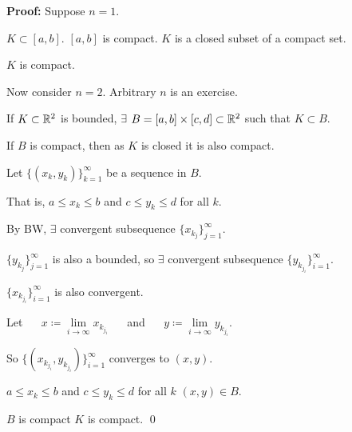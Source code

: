 \documentclass[10pt,aspectratio=149]{beamer}
\begin{document}
\begin{frame}

\textbf{Proof:}
Suppose $n=1$.

\pause
$K \subset [a,b]$.
\pause
\qquad
$[a,b]$ is compact.
\pause
\qquad
$K$ is a closed subset of a compact set.

\pause
\thus \quad $K$ is compact.

\pause
\medskip

Now consider $n=2$.
\pause
\quad
Arbitrary $n$ is an exercise.

\pause
If $K \subset {\mathbb{R}}^2$ is bounded, $\exists$
$B = [a,b]\times[c,d] \subset {\mathbb{R}}^2$ such that $K \subset B$.

\pause
If $B$ is compact, then as $K$ is closed it is also compact.

\pause
\medskip

Let $\bigl\{ (x_k,y_k) \bigr\}_{k=1}^\infty$ be a sequence in $B$.

\pause
That is, $a \leq x_k \leq b$ and $c \leq y_k \leq d$ for all $k$.

\pause
By BW, $\exists$ convergent subsequence
$\{ x_{k_j} \}_{j=1}^\infty$.

\pause
$\{ y_{k_j} \}_{j=1}^\infty$ is also a bounded, so 
$\exists$ convergent
subsequence
$\{ y_{k_{j_i}} \}_{i=1}^\infty$.

\pause
$\{ x_{k_{j_i}} \}_{i=1}^\infty$ is also convergent.

\pause
Let
~~
$x \coloneqq \lim\limits_{i\to\infty} x_{k_{j_i}}$
~~
and
~~
$y \coloneqq \lim\limits_{i\to\infty} y_{k_{j_i}}$.

\pause
\medskip

So 
$\bigl\{ (x_{k_{j_i}},y_{k_{j_i}}) \bigr\}_{i=1}^\infty$ converges to $(x,y)$.

\pause
$a \leq x_k \leq b$ and
$c \leq y_k \leq d$ for all $k$ \wthus $(x,y) \in B$.

\pause
\medskip

$B$ is compact \wthus $K$ is compact.
\qed

\end{frame}
\end{document}
